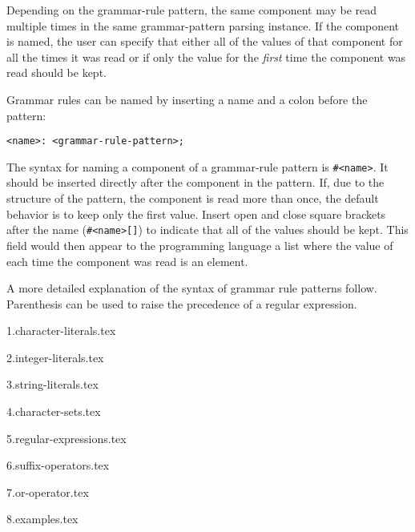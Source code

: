 {	Depending on the grammar-rule pattern, the same component may be read
	multiple times in the same grammar-pattern parsing instance. If the
	component is named, the user can specify that either all of the values
	of that component for all the times it was read or if
	only the value for the \textit{first} time the component was read
	should be kept.
	
	Grammar rules can be named by inserting a name and a colon before the pattern:
	\begin{lstlisting}[numbers = none, texcl = true, language = MAIA]
<name>: <grammar-rule-pattern>;
	\end{lstlisting}
	
	The syntax for naming a component of a grammar-rule pattern is
	\texttt{\#<name>}.
	It should be inserted directly after the component in the pattern.
	If, due to the structure of the pattern, the component is read more than
	once, the default behavior is to keep only the first value. Insert open
	and close square brackets after the name (\texttt{\#<name>[]}) to indicate
	that all of the values should be kept. This field would then appear to the
	programming language a list where the value of each time the component was
	read is an element.
	
	A more detailed explanation of the syntax of grammar rule patterns follow.
	Parenthesis can be used to raise the precedence of a regular expression.
	
	{1.character-literals.tex}
	
	{2.integer-literals.tex}
	
	{3.string-literals.tex}
	
	{4.character-sets.tex}
	
	{5.regular-expressions.tex}
	
	{6.suffix-operators.tex}
	
	{7.or-operator.tex}
	
	{8.examples.tex}
}
















